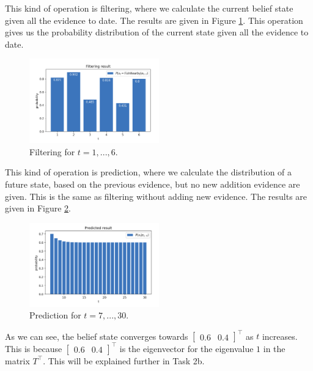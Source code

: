 \documentclass[11pt, a4paper, english]{NTNUoving}
\begin{document}
\begin{oppgave}
\begin{punkt}
    This kind of operation is filtering, where we calculate the current belief state given all the evidence to date.
    The results are given in Figure \ref{fig:filtering}. This operation gives us the probability distribution of the current state given all the evidence to date.
    \begin{figure}[H]
        \centering
        \includegraphics[width=0.5\textwidth]{filtering.png}
        \caption{Filtering for $t = 1,...,6$.}
        \label{fig:filtering}
    \end{figure}

\end{punkt}

\begin{punkt}

    This kind of operation is prediction, where we calculate the distribution of a future state, based on the previous evidence, but no new addition evidence are given.
    This is the same as filtering without adding new evidence. The results are given in Figure \ref{fig:prediction}.
    \begin{figure}[H]
        \centering
        \includegraphics[width=0.5\textwidth]{prediction.png}
        \caption{Prediction for $t = 7,...,30$.}
        \label{fig:prediction}
    \end{figure}
    As we can see, the belief state converges towards $\begin{bmatrix}
        0.6 & 0.4
    \end{bmatrix}^\top$ as $t$ increases. This is because $\begin{bmatrix}
        0.6 & 0.4
    \end{bmatrix}^\top$ is the eigenvector for the eigenvalue $1$ in the matrix $T^\top$. This will be explained further in Task 2b.
\end{punkt}


\end{oppgave}
\end{document}
